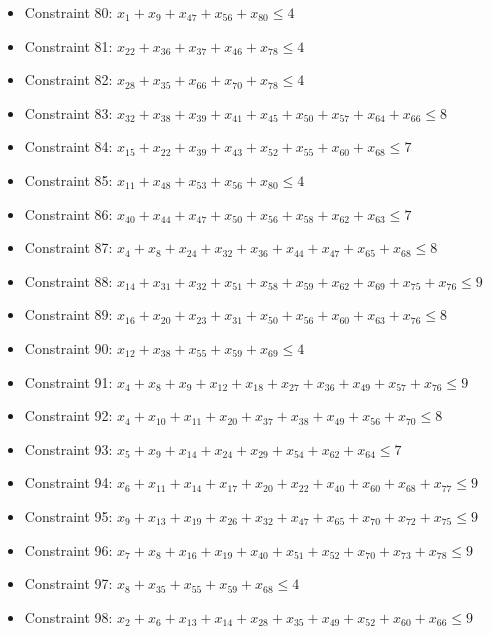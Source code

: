 \documentclass[11pt]{article}
\begin{document}
\begin{itemize}
\item Constraint 80: $x_{1} + x_{9} + x_{47} + x_{56} + x_{80} \le 4$
\item Constraint 81: $x_{22} + x_{36} + x_{37} + x_{46} + x_{78} \le 4$
\item Constraint 82: $x_{28} + x_{35} + x_{66} + x_{70} + x_{78} \le 4$
\item Constraint 83: $x_{32} + x_{38} + x_{39} + x_{41} + x_{45} + x_{50} + x_{57} + x_{64} + x_{66} \le 8$
\item Constraint 84: $x_{15} + x_{22} + x_{39} + x_{43} + x_{52} + x_{55} + x_{60} + x_{68} \le 7$
\item Constraint 85: $x_{11} + x_{48} + x_{53} + x_{56} + x_{80} \le 4$
\item Constraint 86: $x_{40} + x_{44} + x_{47} + x_{50} + x_{56} + x_{58} + x_{62} + x_{63} \le 7$
\item Constraint 87: $x_{4} + x_{8} + x_{24} + x_{32} + x_{36} + x_{44} + x_{47} + x_{65} + x_{68} \le 8$
\item Constraint 88: $x_{14} + x_{31} + x_{32} + x_{51} + x_{58} + x_{59} + x_{62} + x_{69} + x_{75} + x_{76} \le 9$
\item Constraint 89: $x_{16} + x_{20} + x_{23} + x_{31} + x_{50} + x_{56} + x_{60} + x_{63} + x_{76} \le 8$
\item Constraint 90: $x_{12} + x_{38} + x_{55} + x_{59} + x_{69} \le 4$
\item Constraint 91: $x_{4} + x_{8} + x_{9} + x_{12} + x_{18} + x_{27} + x_{36} + x_{49} + x_{57} + x_{76} \le 9$
\item Constraint 92: $x_{4} + x_{10} + x_{11} + x_{20} + x_{37} + x_{38} + x_{49} + x_{56} + x_{70} \le 8$
\item Constraint 93: $x_{5} + x_{9} + x_{14} + x_{24} + x_{29} + x_{54} + x_{62} + x_{64} \le 7$
\item Constraint 94: $x_{6} + x_{11} + x_{14} + x_{17} + x_{20} + x_{22} + x_{40} + x_{60} + x_{68} + x_{77} \le 9$
\item Constraint 95: $x_{9} + x_{13} + x_{19} + x_{26} + x_{32} + x_{47} + x_{65} + x_{70} + x_{72} + x_{75} \le 9$
\item Constraint 96: $x_{7} + x_{8} + x_{16} + x_{19} + x_{40} + x_{51} + x_{52} + x_{70} + x_{73} + x_{78} \le 9$
\item Constraint 97: $x_{8} + x_{35} + x_{55} + x_{59} + x_{68} \le 4$
\item Constraint 98: $x_{2} + x_{6} + x_{13} + x_{14} + x_{28} + x_{35} + x_{49} + x_{52} + x_{60} + x_{66} \le 9$

\end{itemize}
\end{document}
